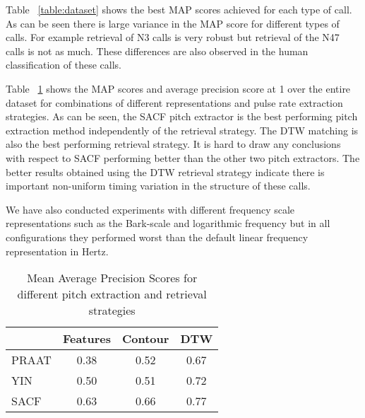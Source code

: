 Table ~\ref{table:dataset} shows the best MAP scores achieved for each
type of call. As can be seen there is large variance in the MAP score
for different types of calls. For example retrieval of N3 calls is
very robust but retrieval of the N47 calls is not as much. These
differences are also observed in the human classification of these
calls. 

Table ~\ref{table:dataset_map} shows the MAP scores and
average precision score at 1 over the entire dataset for combinations
of different representations and pulse rate extraction strategies. As
can be seen, the SACF pitch extractor is the best performing pitch
extraction method independently of the retrieval strategy. The DTW
matching is also the best performing retrieval strategy. It is hard to
draw any conclusions with respect to SACF performing better than the
other two pitch extractors. The better results obtained using the DTW
retrieval strategy indicate there is important non-uniform timing
variation in the structure of these calls. 

We have also conducted experiments with different frequency scale
representations such as the Bark-scale \cite{zwicker1961} and
logarithmic frequency but in all configurations they performed worst
than the default linear frequency representation in Hertz.



\begin{table} 
\begin{center}
\caption{Mean Average Precision Scores for different pitch extraction 
and retrieval strategies} 
\begin{tabular}{|l|c|c|c|}
\hline   
              & Features           & Contour & DTW \\
\hline 
PRAAT     & 0.38       & 0.52         & 0.67 
   \\ 
\hline 
YIN          & 0.50        & 0.51         & 0.72  \\ 
\hline 
SACF        & 0.63     & 0.66          &  0.77 \\ 
\hline 
\end{tabular} 
\label{table:dataset_map}
\end{center}
\end{table} 


